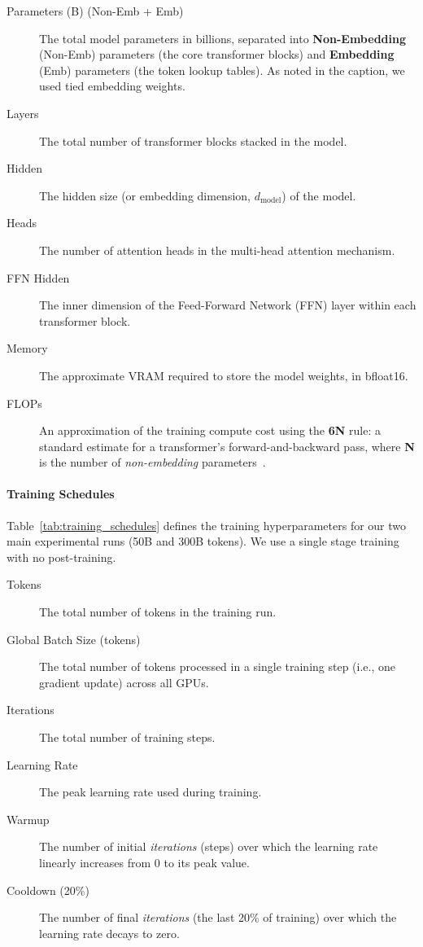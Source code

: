 \begin{description}
    \item[Parameters (B) (Non-Emb + Emb)] The total model parameters in billions, separated into \textbf{Non-Embedding} (Non-Emb) parameters (the core transformer blocks) and \textbf{Embedding} (Emb) parameters (the token lookup tables). As noted in the caption, we used tied embedding weights.
    \item[Layers] The total number of transformer blocks stacked in the model.
    \item[Hidden] The hidden size (or embedding dimension, $d_{\text{model}}$) of the model.
    \item[Heads] The number of attention heads in the multi-head attention mechanism.
    \item[FFN Hidden] The inner dimension of the Feed-Forward Network (FFN) layer within each transformer block.
    \item[Memory] The approximate VRAM required to store the model weights, in bfloat16.
    \item[FLOPs] An approximation of the training compute cost using the  \textbf{6N} rule: a standard estimate for a transformer's forward-and-backward pass, where \textbf{N} is the number of \textit{non-embedding} parameters~\citep{kaplan2020scalinglawsneurallanguage}.
\end{description}


\paragraph{Training Schedules}
Table~\ref{tab:training_schedules} defines the training hyperparameters for our two main experimental runs (50B and 300B tokens). We use a single stage training with no post-training.

\begin{description}
    \item[Tokens] The total number of tokens in the training run.
    \item[Global Batch Size (tokens)] The total number of tokens processed in a single training step (i.e., one gradient update) across all GPUs.
    \item[Iterations] The total number of training steps.
    \item[Learning Rate] The peak learning rate used during training.
    \item[Warmup] The number of initial \textit{iterations} (steps) over which the learning rate linearly increases from 0 to its peak value.
    \item[Cooldown (20\%)] The number of final \textit{iterations} (the last 20\% of training) over which the learning rate decays to zero.
\end{description}

